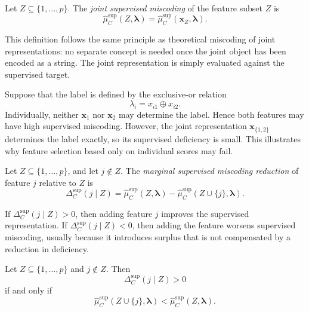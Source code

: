 \begin{definition}
\label{def:joint_supervised_miscoding}
Let \(Z\subseteq\{1,\ldots,p\}\). The \emph{joint supervised miscoding} of the feature subset \(Z\) is
\[
    \hat\mu_C^{\mathrm{sup}}(Z,\boldsymbol{\lambda})
    =
    \hat\mu_C^{\mathrm{sup}}(\mathbf{x}_Z,\boldsymbol{\lambda}).
\]
\end{definition}

This definition follows the same principle as theoretical miscoding of joint representations: no separate concept is needed once the joint object has been encoded as a string. The joint representation is simply evaluated against the supervised target.

\begin{example}
Suppose that the label is defined by the exclusive-or relation
\[
    \lambda_i = x_{i1}\oplus x_{i2}.
\]
Individually, neither \(\mathbf{x}_1\) nor \(\mathbf{x}_2\) may determine the label. Hence both features may have high supervised miscoding. However, the joint representation \(\mathbf{x}_{\{1,2\}}\) determines the label exactly, so its supervised deficiency is small. This illustrates why feature selection based only on individual scores may fail.
\end{example}

\begin{definition}
\label{def:marginal_supervised_miscoding_reduction}
Let \(Z\subseteq\{1,\ldots,p\}\), and let \(j\notin Z\). The \emph{marginal supervised miscoding reduction} of feature \(j\) relative to \(Z\) is
\[
    \Delta_C^{\mathrm{sup}}(j\mid Z)
    =
    \hat\mu_C^{\mathrm{sup}}(Z,\boldsymbol{\lambda})
    -
    \hat\mu_C^{\mathrm{sup}}(Z\cup\{j\},\boldsymbol{\lambda}).
\]
\end{definition}

If \(\Delta_C^{\mathrm{sup}}(j\mid Z)>0\), then adding feature \(j\) improves the supervised representation. If \(\Delta_C^{\mathrm{sup}}(j\mid Z)<0\), then adding the feature worsens supervised miscoding, usually because it introduces surplus that is not compensated by a reduction in deficiency.

\begin{proposition}
\label{prop:marginal_positive_improvement}
Let \(Z\subseteq\{1,\ldots,p\}\) and \(j\notin Z\). Then
\[
    \Delta_C^{\mathrm{sup}}(j\mid Z)>0
\]
if and only if
\[
    \hat\mu_C^{\mathrm{sup}}(Z\cup\{j\},\boldsymbol{\lambda})
    <
    \hat\mu_C^{\mathrm{sup}}(Z,\boldsymbol{\lambda}).
\]
\end{proposition}

